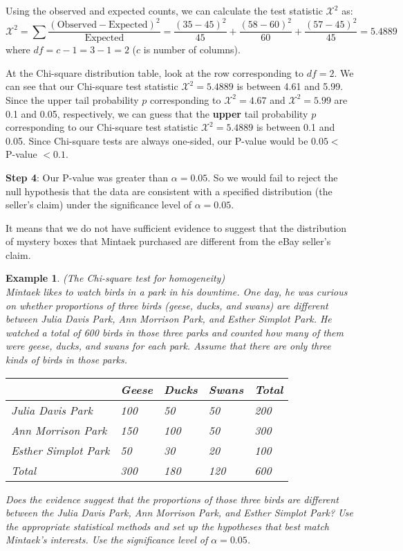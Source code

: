 \documentclass[12pt]{article}
\newcounter{lecnum}
\newtheorem{example}{Example}[lecnum]
\begin{document}
\vspace{-10 pt}
Using the observed and expected counts, we can calculate the test statistic $\mathcal{X}^2$ as:
\[ \mathcal{X}^2 = \sum \dfrac{(\text{Observed} - \text{Expected})^2}{\text{Expected}} = \dfrac{(35-45)^2}{45} + \dfrac{(58-60)^2}{60} + \dfrac{(57-45)^2}{45} = 5.4889 \]
where $df = c - 1 = 3 - 1 = 2$ ($c$ is number of columns).

At the Chi-square distribution table, look at the row corresponding to $df = 2$. We can see that our Chi-square test statistic $\mathcal{X}^2 = 5.4889$ is between 4.61 and 5.99. Since the upper tail probability $p$ corresponding to $\mathcal{X}^2 = 4.67$ and $\mathcal{X}^2 = 5.99$ are 0.1 and 0.05, respectively, we can guess that the \textbf{upper} tail probability $p$ corresponding to our Chi-square test statistic $\mathcal{X}^2 = 5.4889$ is between 0.1 and 0.05. Since Chi-square tests are always one-sided, our P-value would be $0.05 <$ P-value $< 0.1$.

\noindent \textbf{Step 4}: Our P-value was greater than $\alpha = 0.05$. So we would fail to reject the null hypothesis that the data are consistent with a specified distribution (the seller's claim) under the significance level of $\alpha = 0.05$.

It means that we do not have sufficient evidence to suggest that the distribution of mystery boxes that Mintaek purchased are different from the eBay seller's claim.

\pagebreak

\begin{example} (\textit{The Chi-square test for homogeneity}) \\
	Mintaek likes to watch birds in a park in his downtime. One day, he was curious on whether proportions of three birds (geese, ducks, and swans) are different between Julia Davis Park, Ann Morrison Park, and Esther Simplot Park. He watched a total of 600 birds in those three parks and counted how many of them were geese, ducks, and swans for each park. Assume that there are only three kinds of birds in those parks.
	\begin{table}[h]
		\centering
		\begin{tabular}{l|lll|l}
			& Geese & Ducks & Swans & Total \\ \hline
			Julia Davis Park & 100 & 50 & 50 & 200 \\
			Ann Morrison Park & 150 & 100 & 50 & 300 \\ 
			Esther Simplot Park & 50 & 30 & 20 & 100 \\ \hline
			Total & 300 & 180 & 120 & 600
		\end{tabular}
	\end{table}
	
	Does the evidence suggest that the proportions of those three birds are different between the Julia Davis Park, Ann Morrison Park, and Esther Simplot Park? Use the appropriate statistical methods and set up the hypotheses that best match Mintaek's interests. Use the significance level of $\alpha = 0.05$.
\end{example}
\end{document}

